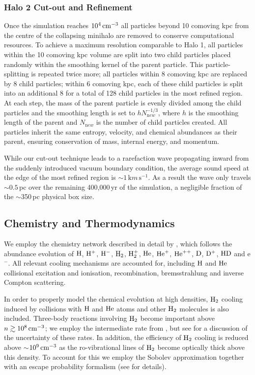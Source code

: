 \documentclass[../thesis.tex]{subfiles}
\begin{document}
\subsubsection{Halo 2 Cut-out and Refinement}
\label{cutout}

Once the simulation reaches $10^4\,\mathrm{cm}^{-3}$ all particles beyond 10 comoving kpc from the centre of the collapsing minihalo are removed to conserve computational resources. 
To achieve a maximum resolution comparable to Halo 1, all particles within the 10 comoving kpc volume are split into two child particles placed randomly within the smoothing kernel of the parent particle.  
This particle-splitting is repeated twice more; all particles within 8 comoving kpc are replaced by 8 child particles; within 6 comoving kpc, each of these child particles is split into an additional 8 for a total of 128 child particles in the most refined region.  
At each step, the mass of the parent particle is evenly divided among the child particles and the smoothing length is set to $h N_{\mathrm new}^{-1/3}$, where $h$ is the smoothing length of the parent and $N_{\mathrm new}$ is the number of child particles created.  
All particles inherit the same entropy, velocity, and chemical abundances as their parent, ensuring conservation of mass, internal energy, and momentum.

While our cut-out technique leads to a rarefaction wave propagating inward from the suddenly introduced vacuum boundary condition, the average sound speed at the edge of the most refined region is $\sim$$1\,{\mathrm km}\,{\mathrm s}^{-1}$.  
As a result the wave only travels $\sim$$0.5\,$pc over the remaining 400,000$\,$yr of the simulation, a negligible fraction of the $\sim$350$\,$pc physical box size.

\subsection{Chemistry and Thermodynamics}
\label{chemistry}
 We employ the chemistry network described in detail by \citet{Greifetal2009b}, which follows the abundance evolution of $\mathrm{H}$, $\mathrm{H}^+$, $\mathrm{H}^-$, $\mathrm{H}_2$, $\mathrm{H}_2^+$, $\mathrm{He}$, $\mathrm{He}^+$, $\mathrm{He}^{++}$, $\mathrm{D}$, $\mathrm{D}^+$, $\mathrm{HD}$ and e$^-$. 
 All relevant cooling mechanisms are accounted for, including $\mathrm{H}$ and $\mathrm{He}$ collisional excitation and ionisation, recombination, bremsstrahlung and inverse Compton scattering. 
 
 In order to properly model the chemical evolution at high densities, $\mathrm{H}_2$ cooling induced by collisions with $\mathrm{H}$ and $\mathrm{He}$ atoms and other $\mathrm{H}_2$ molecules is also included.  
 Three-body reactions involving $\mathrm{H}_2$ become important above $n \gtrsim 10^8\,\mathrm{cm}^{-3}$; we employ the intermediate rate from \citet{PallaSalpeterStahler1983}, but see \citet{Turketal2011} for a discussion of the uncertainty of these rates. 
 In addition, the efficiency of $\mathrm{H}_2$ cooling is reduced above $\sim$$10^9\,\mathrm{cm}^{-3}$ as the ro-vibrational lines of $\mathrm{H}_2$ become optically thick above this density.  
 To account for this we employ the Sobolev approximation together with an escape probability formalism (see \citealt{Yoshidaetal2006, Greifetal2011} for details). 
\end{document}
